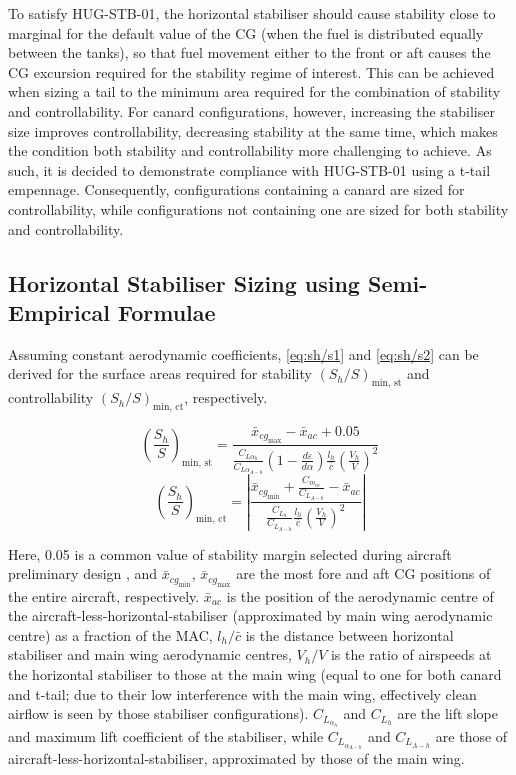 To satisfy HUG-STB-01, the horizontal stabiliser should cause stability close to marginal for the default value of the CG (when the fuel is distributed equally between the tanks), so that fuel movement either to the front or aft causes the CG excursion required for the stability regime of interest. This can be achieved when sizing a tail to the minimum area required for the combination of stability and controllability. For canard configurations, however, increasing the stabiliser size improves controllability, decreasing stability at the same time, which makes the condition both stability and controllability more challenging to achieve. As such, it is decided to demonstrate compliance with HUG-STB-01 using a t-tail empennage. Consequently, configurations containing a canard are sized for controllability, while configurations not containing one are sized for both stability and controllability. 

\subsection{Horizontal Stabiliser Sizing using Semi-Empirical Formulae}
\label{sub:semi-empirical-tail}
Assuming constant aerodynamic coefficients, \autoref{eq:sh/s1} and \autoref{eq:sh/s2} can be derived for the surface areas required for stability $(S_h/S)_{\text{min, st}}$ and controllability $(S_h/S)_{\text{min, ct}}$, respectively.

\begin{equation}
\label{eq:sh/s1}
    \left(\frac{S_h}{S}\right)_{\text{min, st}} = \frac{\bar{x}_{{cg}_\text{max}}-\bar{x}_{ac} + 0.05}{\frac{C_{L\alpha_h}}{C_{L\alpha_{A-h}}} \left( 1 - \frac{d\varepsilon}{d\alpha} \right) \frac{l_h}{\bar{c}} \left( \frac{V_h}{V} \right)^2} 
\end{equation}
\begin{equation}
\label{eq:sh/s2}
    \left(\frac{S_h}{S}\right)_{\text{min, ct}} = \left|\frac{\bar{x}_{{cg}_\text{min}} + \frac{C_{m_{ac}}}{C_{L_{A-h}}} - \bar{x}_{ac}}{\frac{C_{L_h}}{C_{L_{A-h}}} \frac{l_h}{\bar{c}} \left( \frac{V_h}{V} \right)^2}\right|
\end{equation}

Here, 0.05 is a common value of stability margin selected during aircraft preliminary design \cite{stat-stab-margin}, and $\bar{x}_{{cg}_\text{min}}$, $\bar{x}_{{cg}_\text{max}}$ are the most fore and aft CG positions of the entire aircraft, respectively. $\bar{x}_{ac}$ is the position of the aerodynamic centre of the aircraft-less-horizontal-stabiliser (approximated by main wing aerodynamic centre) as a fraction of the MAC, $l_h/\bar c$ is the distance between horizontal stabiliser and main wing aerodynamic centres, $V_h/V$ is the ratio of airspeeds at the horizontal stabiliser to those at the main wing (equal to one for both canard and t-tail; due to their low interference with the main wing, effectively clean airflow is seen by those stabiliser configurations).
$C_{L_{\alpha_h}}$ and $C_{L_{h}}$ are the lift slope and maximum lift coefficient of the stabiliser, while $C_{L_{\alpha_{A-h}}}$ and $C_{L_{A-h}}$ are those of aircraft-less-horizontal-stabiliser, approximated by those of the main wing. 

